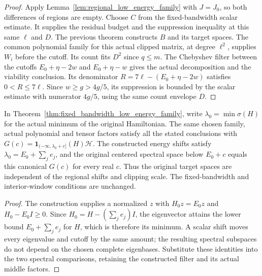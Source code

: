 \begin{proof}\leanok
    Apply Lemma~\ref{lem:regional_low_energy_family} with $J=J_0$,
    so both differences of regions are empty.
    Choose $C$ from the fixed-bandwidth scalar estimate.
    It supplies the residual budget and the suppression inequality at
    this same $\ell$ and $D$. The previous theorem constructs $B$ and
    its target spaces. The common polynomial family for this actual
    clipped matrix, at degree $\ell^2$, supplies $W_i$ before the cutoff.
    Its count fits $D^2$ since $q\le m$.
    The Chebyshev filter between the cutoffs
    $E_0+\eta-2w$ and $E_0+\eta-w$ gives the actual decomposition and
    the viability conclusion. Its denominator
    $R=7\ell-(E_0+\eta-2w)$ satisfies $0<R\le7\ell$.
    Since $w\ge g>4g/5$, its suppression is bounded by the scalar
    estimate with numerator $4g/5$, using the same count envelope $D$.
\end{proof}


\begin{corollary}
    \label{cor:canonical_low_energy_family}
    \leanok
    In Theorem~\ref{thm:fixed_bandwidth_low_energy_family}, write
    $\lambda_0=\min\sigma(H)$ for the actual minimum of the original
    Hamiltonian. The same chosen family, actual polynomial and tensor
    factors satisfy all the stated conclusions with
    $G(c)=\mathbf1_{(-\infty,\lambda_0+c]}(H)\mathcal H$.
    The constructed energy shifts satisfy $\lambda_0=E_0+\sum_j e_j$,
    and the original centered spectral space below $E_0+c$ equals this
    canonical $G(c)$ for every real $c$.
    Thus the original target spaces are independent of the regional
    shifts and clipping scale. The fixed-bandwidth and interior-window
    conditions are unchanged.
\end{corollary}
\begin{proof}\leanok
    The construction supplies a normalized $z$ with $H_0z=E_0z$ and
    $H_0-E_0I\ge0$. Since $H_0=H-(\sum_j e_j)I$, the eigenvector attains
    the lower bound $E_0+\sum_j e_j$ for $H$, which is therefore its
    minimum. A scalar shift moves every eigenvalue and cutoff by the
    same amount; the resulting spectral subspaces do not depend on the
    chosen complete eigenbases. Substitute these identities into the
    two spectral comparisons, retaining the constructed filter and its
    actual middle factors.
\end{proof}


